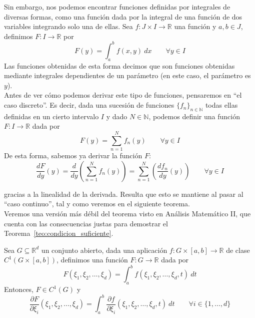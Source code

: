 Sin embargo, nos podemos encontrar funciones definidas por integrales de diversas formas, como una función dada por la integral de una función de dos variables integrando solo una de ellas. Sea $f:J\times I\rightarrow\mathbb{R}$ una función y $a,b\in J$, definimos $F:I\rightarrow\mathbb{R}$ por
\begin{equation*}
    F(y) = \int_{a}^{b} f(x,y)~dx  \qquad \forall y\in I
\end{equation*}
Las funciones obtenidas de esta forma decimos que son funciones obtenidas mediante integrales dependientes de un parámetro (en este caso, el parámetro es $y$).\\

Antes de ver cómo podemos derivar este tipo de funciones, pensaremos en ``el caso discreto''. Es decir, dada una sucesión de funciones ${\{f_n\}}_{n\in \mathbb{N}}$ todas ellas definidas en un cierto intervalo $I$ y dado $N\in \mathbb{N}$, podemos definir una función $F:I\rightarrow\mathbb{R}$ dada por
\begin{equation*}
    F(y) = \sum_{n=1}^{N} f_n(y) \qquad \forall y\in I
\end{equation*}
De esta forma, sabemos ya derivar la función $F$:
\begin{equation*}
    \dfrac{dF}{dy}(y) = \dfrac{d}{dy}\left(\sum_{n=1}^{N}f_n(y)\right) = \sum_{n=1}^{N}\left(\dfrac{df_n}{dy}(y)\right) \qquad \forall y\in I
\end{equation*}

gracias a la linealidad de la derivada. Resulta que esto se mantiene al pasar al ``caso continuo'', tal y como veremos en el siguiente teorema.\\

Veremos una versión más débil del teorema visto en Análisis Matemático II, que cuenta con las consecuencias justas para demostrar el Teorema~\ref{teo:condicion_suficiente}.
\begin{teo}
    Sea $G\subseteq \mathbb{R}^d$ un conjunto abierto, dada una aplicación $f:G\times [a,b]\rightarrow\mathbb{R}$ de clase $C^1(G\times [a,b])$, definimos una función $F:G\rightarrow\mathbb{R}$ dada por
\begin{equation*}
    F(\xi_1, \xi_2, \ldots, \xi_d) = \int_{a}^{b} f(\xi_1, \xi_2, \ldots, \xi_d, t)~dt
\end{equation*}
Entonces, $F\in C^1(G)$ y 
\begin{equation*}
    \dfrac{\partial F}{\partial \xi_i}(\xi_1, \xi_2, \ldots, \xi_d) = \int_{a}^{b} \dfrac{\partial f}{\partial \xi_i}(\xi_1, \xi_2, \ldots, \xi_d, t)~dt \qquad \forall i \in \{1,\ldots, d\}
\end{equation*}
\end{teo}


